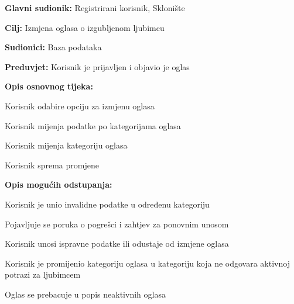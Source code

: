 					\noindent {}
					\begin{packed_item}
						
						\item \textbf{Glavni sudionik: }Registrirani korisnik, Sklonište
						\item  \textbf{Cilj:} Izmjena oglasa o izgubljenom ljubimcu
						\item  \textbf{Sudionici:} Baza podataka
						\item  \textbf{Preduvjet:} Korisnik je prijavljen i objavio je oglas
						\item  \textbf{Opis osnovnog tijeka:}
						
						\item[] \begin{packed_enum}
							
							\item Korisnik odabire opciju za izmjenu oglasa
							\item 
								\begin{packed_item}
									\item[a$)$] Korisnik mijenja podatke po kategorijama oglasa
									\item[b$)$] Korisnik mijenja kategoriju oglasa 
								\end{packed_item}
							\item Korisnik sprema promjene
						\end{packed_enum}
						
						\item  \textbf{Opis mogućih odstupanja:}
						
						\item[] \begin{packed_item}
							
							\item[2.a] Korisnik je unio invalidne podatke u određenu kategoriju
							\item[] \begin{packed_enum}
								
								\item  Pojavljuje se poruka o pogrešci i zahtjev za ponovnim unosom
								\item Korisnik unosi ispravne podatke ili odustaje od izmjene oglasa
								
							\end{packed_enum}
							\item[3.a] Korisnik je promijenio kategoriju oglasa u kategoriju koja ne odgovara aktivnoj potrazi za ljubimcem
							\begin{packed_enum}
								
								\item Oglas se prebacuje u popis neaktivnih oglasa
								
							\end{packed_enum}
							
						\end{packed_item}
					\end{packed_item}
